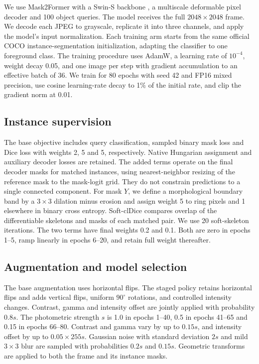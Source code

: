 \documentclass[sigconf]{acmart}
\begin{document}
We use Mask2Former \cite{cheng2022mask2former} with a Swin-S backbone \cite{liu2021swin}, a multiscale deformable pixel decoder and 100 object queries. The model receives the full $2048\times2048$ frame. We decode each JPEG to grayscale, replicate it into three channels, and apply the model's input normalization. Each training arm starts from the same official COCO instance-segmentation initialization, adapting the classifier to one foreground class. The training procedure uses AdamW, a learning rate of $10^{-4}$, weight decay 0.05, and one image per step with gradient accumulation to an effective batch of 36. We train for 80 epochs with seed 42 and FP16 mixed precision, use cosine learning-rate decay to 1\% of the initial rate, and clip the gradient norm at 0.01.

\subsection{Instance supervision}
The base objective includes query classification, sampled binary mask loss and Dice loss with weights 2, 5 and 5, respectively. Native Hungarian assignment and auxiliary decoder losses are retained. The added terms operate on the final decoder masks for matched instances, using nearest-neighbor resizing of the reference mask to the mask-logit grid. They do not constrain predictions to a single connected component. For mask $Y$, we define a morphological boundary band by a $3\times3$ dilation minus erosion and assign weight 5 to ring pixels and 1 elsewhere in binary cross entropy. Soft-clDice \cite{shit2021cldice} compares overlap of the differentiable skeletons and masks of each matched pair. We use 20 soft-skeleton iterations. The two terms have final weights 0.2 and 0.1. Both are zero in epochs 1--5, ramp linearly in epochs 6--20, and retain full weight thereafter.

\clearpage
\subsection{Augmentation and model selection}
The base augmentation uses horizontal flips. The staged policy retains horizontal flips and adds vertical flips, uniform $90^\circ$ rotations, and controlled intensity changes. Contrast, gamma and intensity offset are jointly applied with probability $0.8s$. The photometric strength $s$ is 1.0 in epochs 1--40, 0.5 in epochs 41--65 and 0.15 in epochs 66--80. Contrast and gamma vary by up to $0.15s$, and intensity offset by up to $0.05\times255s$. Gaussian noise with standard deviation $2s$ and mild $3\times3$ blur are sampled with probabilities $0.2s$ and $0.15s$. Geometric transforms are applied to both the frame and its instance masks.
\end{document}
